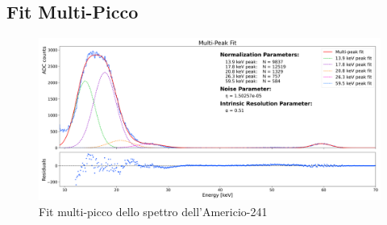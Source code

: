 \documentclass[twocolumn,10pt]{asme2ej}
\begin{document}
\subsection{Fit Multi-Picco}\label{s:multipicco}

\begin{figure}
    \centering
    \includegraphics[width=\textwidth]{../Plots/multifit.png}
   \caption{Fit multi-picco dello spettro dell'Americio-241}
    \label{i:multifit}
\end{figure}
\end{document}
